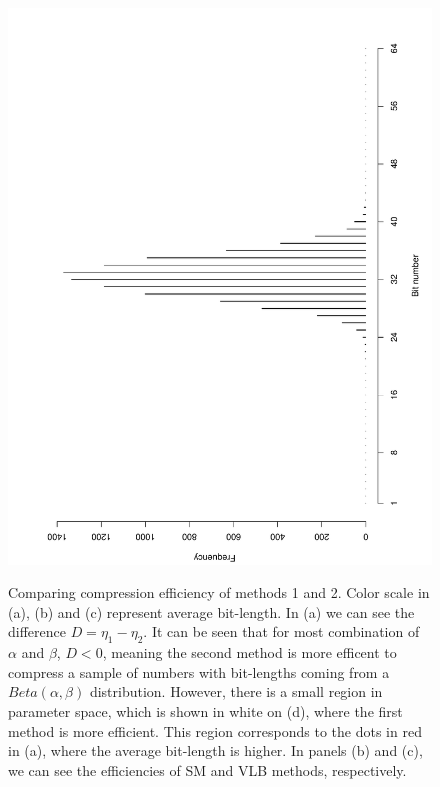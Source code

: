 \documentclass[10pt]{article}
\begin{document}
\begin{figure}[h]
{   \includegraphics[scale=0.18,clip]{fig05}
   }
  \caption{Comparing compression efficiency of methods 1 and 2. Color scale in (a), (b) and (c) represent average bit-length. In (a) we can see the difference $D = \eta_1 - \eta_2$. It can be seen that for most combination of $\alpha$ and $\beta$, $D<0$, meaning the second method is more efficent to compress a sample of numbers with bit-lengths coming from a $Beta(\alpha,\beta)$ distribution. However, there is a small region in parameter space, which is shown in white on (d), where the first method is more efficient. This region corresponds to the dots in red in (a), where the average bit-length is higher. In panels (b) and (c), we can see the efficiencies of SM and VLB methods, respectively.}
  \label{fig:06070809}
\end{figure}
 
\end{document}
